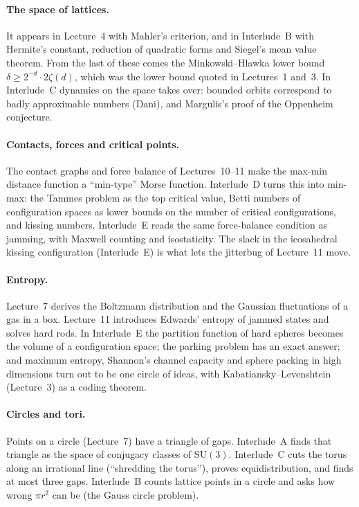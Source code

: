 \documentclass[11pt,openany]{book}
\theoremstyle{plain}
\theoremstyle{definition}
\theoremstyle{remark}
\newcommand{\dens}{\delta}             %
\begin{document}
\paragraph{The space of lattices.} It appears in Lecture~4 with Mahler's criterion, and in
Interlude~B with Hermite's constant, reduction of quadratic forms and Siegel's mean value theorem. From
the last of these comes the Minkowski--Hlawka lower bound $\dens\ge 2^{-d}\cdot2\zeta(d)$, which was the
lower bound quoted in Lectures~1 and~3. In Interlude~C dynamics on the space takes over: bounded orbits
correspond to badly approximable numbers (Dani), and Margulis's proof of the Oppenheim conjecture.

\paragraph{Contacts, forces and critical points.} The contact graphs and force balance of
Lectures~10--11 make the max-min distance function a ``min-type'' Morse function. Interlude~D turns this
into min-max: the Tammes problem as the top critical value, Betti numbers of configuration spaces as
lower bounds on the number of critical configurations, and kissing numbers. Interlude~E reads the same
force-balance condition as jamming, with Maxwell counting and isostaticity. The slack in the
icosahedral kissing configuration (Interlude~E) is what lets the jitterbug of Lecture~11 move.

\paragraph{Entropy.} Lecture~7 derives the Boltzmann distribution and the Gaussian fluctuations of a
gas in a box. Lecture~11 introduces Edwards' entropy of jammed states and solves hard rods. In
Interlude~E the partition function of hard spheres becomes the volume of a configuration space; the
parking problem has an exact answer; and maximum entropy, Shannon's channel capacity and sphere
packing in high dimensions turn out to be one circle of ideas, with Kabatiansky--Levenshtein
(Lecture~3) as a coding theorem.

\paragraph{Circles and tori.} Points on a circle (Lecture~7) have a triangle of gaps. Interlude~A finds
that triangle as the space of conjugacy classes of $\mathrm{SU}(3)$. Interlude~C cuts the torus along an
irrational line (``shredding the torus''), proves equidistribution, and finds at most three gaps.
Interlude~B counts lattice points in a circle and asks how wrong $\pi r^2$ can be (the Gauss circle
problem).
\end{document}
